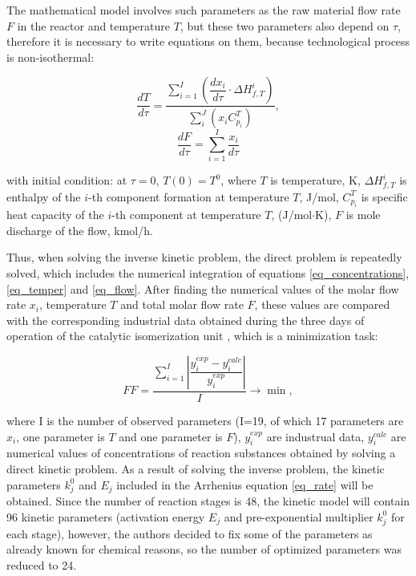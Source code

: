\documentclass[mathematics,article,submit,pdftex,moreauthors]{Definitions/mdpi}
\begin{document}
The mathematical model involves such parameters as the raw material flow rate $F$ in the reactor and temperature $T$, but these two parameters also depend on $\tau$, therefore it is necessary to write equations on them, because technological process is non-isothermal:
\begin{linenomath}
\begin{equation}\label{eq_temper}
\dfrac{dT}{d\tau} = \dfrac{\sum_{i=1}^I\left( \dfrac{dx_i}{d\tau} \cdot \Delta H^i_{f,T} \right) }{\sum_i^J \left(x_i C^T_{p_i} \right) },
\end{equation}\label{eq_flow}
\begin{equation}
\dfrac{dF}{d\tau} = \sum_{i=1}^I  \dfrac{x_i}{d\tau}
\end{equation}
\end{linenomath}
with initial condition: at $\tau = 0$, $T(0) = T^0$, where $T$ is temperature, K, $\Delta H^i_{f,T}$ is enthalpy of the $i$-th component formation at temperature $T$, J/mol, $C^T_{p_i}$ is specific heat capacity of the $i$-th component at temperature $T$, (J/mol$\cdot$K), $F$ is mole discharge of the flow, kmol/h.

Thus, when solving the inverse kinetic problem, the direct problem is repeatedly solved, which includes the numerical integration of equations \eqref{eq_concentrations}, \eqref{eq_temper} and \eqref{eq_flow}. After finding the numerical values of the molar flow rate $x_i$, temperature $T$ and total molar flow rate $F$, these values are compared with the corresponding industrial data obtained during the three days of operation of the catalytic isomerization unit \cite{enik2021}, which is a minimization task:

\begin{linenomath}
\begin{equation}
FF = \dfrac{\sum_{i=1}^I \left| \dfrac{y_i^{exp} - y_i^{calc}}{y_i^{exp}} \right|}{I} \rightarrow \min,
\end{equation}
\end{linenomath}

where I is the number of observed parameters (I=19, of which 17 parameters are $x_i$, one parameter is $T$ and one parameter is $F$),  $y_{i}^{exp}$ are industrual data, $y_{i}^{calc}$ are numerical values of concentrations of reaction substances obtained by solving a direct kinetic problem. As a result of solving the inverse problem, the kinetic parameters $k^0_j$ and $E_j$ included in the Arrhenius equation \eqref{eq_rate} will be obtained. Since the number of reaction stages is 48, the kinetic model will contain 96 kinetic parameters (activation energy $E_j$ and pre-exponential multiplier $k^0_j$ for each stage), however, the authors decided to fix some of the parameters as already known for chemical reasons, so the number of optimized parameters was reduced to 24.
\end{document}
